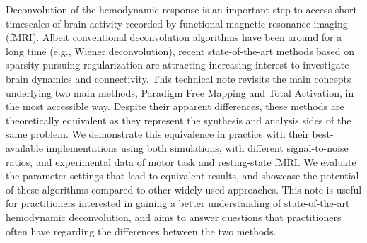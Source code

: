 Deconvolution of the hemodynamic response is an important step to access short timescales of brain activity recorded by functional magnetic resonance imaging (fMRI). Albeit conventional deconvolution algorithms have been around for a long time (e.g., Wiener deconvolution), recent state-of-the-art methods based on sparsity-pursuing regularization are attracting increasing interest to investigate brain dynamics and connectivity. This technical note revisits the main concepts underlying two main methods, Paradigm Free Mapping and Total Activation, in the most accessible way. Despite their apparent differences, these methods are theoretically equivalent as they represent the synthesis and analysis sides of the same problem. We demonstrate this equivalence in practice with their best-available implementations using both simulations, with different signal-to-noise ratios, and experimental data of motor task and resting-state fMRI. We evaluate the parameter settings that lead to equivalent results, and showcase the potential of these algorithms compared to other widely-used approaches. This note is useful for practitioners interested in gaining a better understanding of state-of-the-art hemodynamic deconvolution, and aims to answer questions that practitioners often have regarding the differences between the two methods.